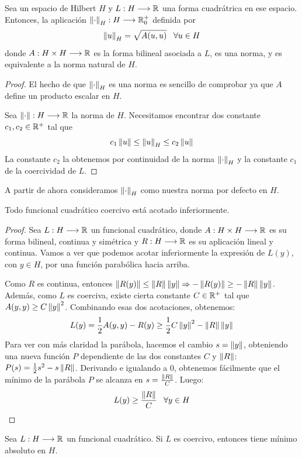 \begin{prop}
Sea un espacio de Hilbert $H$ y $L : H \longrightarrow \mathbb{R}$ una forma cuadrátrica en ese espacio.
Entonces, la aplicación $\left\lVert\cdot\right\rVert_H : H \longrightarrow \mathbb{R}^+_0$ definida por 
\[
\left\lVert u\right\rVert_H=\sqrt{A(u,u)} \;\;\; \forall u\in H
\]
donde $A : H\times H \longrightarrow \mathbb{R}$ es la forma bilineal asociada a $L$, es una norma, y es equivalente a la norma natural de $H$.
\end{prop}
\begin{proof}
El hecho de que $\left\lVert\cdot\right\rVert_H$ es una norma es sencillo de comprobar ya que $A$ define un producto escalar en $H$.

Sea $\left\lVert\cdot\right\rVert : H \longrightarrow \mathbb{R}$ la norma de $H$. Necesitamos encontrar dos constante $c_1,c_2\in\mathbb{R}^+$ tal que 
\[
c_1\left\lVert u\right\rVert\leq \left\lVert u\right\rVert_H \leq c_2\left\lVert u\right\rVert
\]
La constante $c_2$ la obtenemos por continuidad de la norma $\left\lVert\cdot\right\rVert_H$ y la constante $c_1$ de la coercividad de $L$.

\end{proof}
A partir de ahora consideramos $\left\lVert\cdot\right\rVert_H$ como nuestra norma por defecto en $H$.
\begin{prop}
Todo funcional cuadrático coercivo está acotado inferiormente.
\end{prop}
\begin{proof}
Sea $L : H \longrightarrow \mathbb{R}$ un funcional cuadrático, donde $A : H\times H \longrightarrow \mathbb{R}$ es su forma bilineal, continua y simétrica y $R : H \longrightarrow \mathbb{R}$ es su aplicación lineal y continua.
Vamos a ver que podemos acotar inferiormente la expresión de $L(y)$, con $y\in H$, por una función parabólica hacia arriba.

Como $R$ es continua, entonces $\left\lVert R(y)\right\rVert\leq \left\lVert R\right\rVert\left\lVert y\right\rVert \Rightarrow -\left\lVert R(y)\right\rVert \geq -\left\lVert R\right\rVert\left\lVert y\right\rVert$. Además, como $L$ es coerciva, existe cierta constante $C\in\mathbb{R}^+$ tal que $A(y,y)\geq C\left\lVert y\right\rVert^2$. Combinando esas dos acotaciones, obtenemos:
\[
L(y)=\frac{1}{2}A(y,y)-R(y)\geq \frac{1}{2}C\left\lVert y\right\rVert^2-\left\lVert R\right\rVert\left\lVert y\right\rVert
\]
Para ver con más claridad la parábola, hacemos el cambio $s=\left\lVert y\right\rVert$, obteniendo una nueva función $P$ dependiente de las dos constantes $C$ y $\left\lVert R\right\rVert$: $P(s)=\frac{1}{2}s^2-s\left\lVert R\right\rVert$. Derivando e igualando a 0, obtenemos fácilmente que el mínimo de la parábola $P$ se alcanza en $s=\frac{\left\lVert R\right\rVert}{C}$. Luego:
\[
L(y)\geq \frac{\left\lVert R\right\rVert}{C} \;\;\; \forall y\in H 
\]

\end{proof}

\begin{theorem}
\label{laxmilgran}
Sea $L : H \longrightarrow \mathbb{R}$ un funcional cuadrático. Si $L$ es coercivo, entonces tiene mínimo absoluto en $H$.
\end{theorem}

